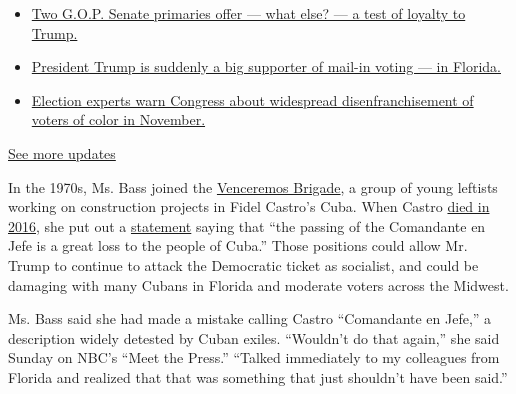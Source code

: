 \begin{itemize}
\tightlist
\item
  \href{https://www.nytimes3xbfgragh.onion/2020/08/04/us/elections/primary-election-michigan-arizona-kansas.html?action=click\&pgtype=Article\&state=default\&region=MAIN_CONTENT_1\&context=storylines_live_updates\#link-3924dd44}{Two
  G.O.P. Senate primaries offer --- what else? --- a test of loyalty to
  Trump.}
\item
  \href{https://www.nytimes3xbfgragh.onion/2020/08/04/us/elections/primary-election-michigan-arizona-kansas.html?action=click\&pgtype=Article\&state=default\&region=MAIN_CONTENT_1\&context=storylines_live_updates\#link-32b39e33}{President
  Trump is suddenly a big supporter of mail-in voting --- in Florida.}
\item
  \href{https://www.nytimes3xbfgragh.onion/2020/08/04/us/elections/primary-election-michigan-arizona-kansas.html?action=click\&pgtype=Article\&state=default\&region=MAIN_CONTENT_1\&context=storylines_live_updates\#link-6d019753}{Election
  experts warn Congress about widespread disenfranchisement of voters of
  color in November.}
\end{itemize}

\href{https://www.nytimes3xbfgragh.onion/2020/08/04/us/elections/primary-election-michigan-arizona-kansas.html?action=click\&pgtype=Article\&state=default\&region=MAIN_CONTENT_1\&context=storylines_live_updates}{See
more updates}

In the 1970s, Ms. Bass joined the
\href{https://www.theatlantic.com/politics/archive/2020/07/karen-bass-cuba-venceremos-brigade/614662/}{Venceremos
Brigade}, a group of young leftists working on construction projects in
Fidel Castro's Cuba. When Castro
\href{https://www.nytimes3xbfgragh.onion/2016/11/26/world/americas/fidel-castro-dies.html}{died
in 2016}, she put out a
\href{https://bass.house.gov/media-center/press-releases/rep-bass-statement-passing-fidel-castro}{statement}
saying that ``the passing of the Comandante en Jefe is a great loss to
the people of Cuba.'' Those positions could allow Mr. Trump to continue
to attack the Democratic ticket as socialist, and could be damaging with
many Cubans in Florida and moderate voters across the Midwest.

Ms. Bass said she had made a mistake calling Castro ``Comandante en
Jefe,'' a description widely detested by Cuban exiles. ``Wouldn't do
that again,'' she said Sunday on NBC's ``Meet the Press.'' ``Talked
immediately to my colleagues from Florida and realized that that was
something that just shouldn't have been said.''

